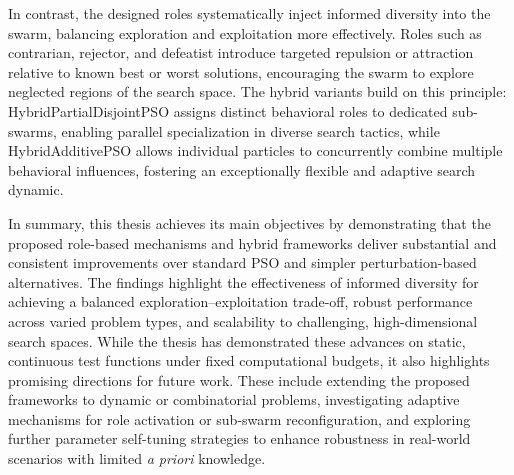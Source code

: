 In contrast, the designed roles systematically inject informed diversity into the swarm, balancing exploration and exploitation more effectively. Roles such as contrarian, rejector, and defeatist introduce targeted repulsion or attraction relative to known best or worst solutions, encouraging the swarm to explore neglected regions of the search space. The hybrid variants build on this principle: HybridPartialDisjointPSO assigns distinct behavioral roles to dedicated sub-swarms, enabling parallel specialization in diverse search tactics, while HybridAdditivePSO allows individual particles to concurrently combine multiple behavioral influences, fostering an exceptionally flexible and adaptive search dynamic.

In summary, this thesis achieves its main objectives by demonstrating that the proposed role-based mechanisms and hybrid frameworks deliver substantial and consistent improvements over standard PSO and simpler perturbation-based alternatives. The findings highlight the effectiveness of informed diversity for achieving a balanced exploration–exploitation trade-off, robust performance across varied problem types, and scalability to challenging, high-dimensional search spaces. While the thesis has demonstrated these advances on static, continuous test functions under fixed computational budgets, it also highlights promising directions for future work. These include extending the proposed frameworks to dynamic or combinatorial problems, investigating adaptive mechanisms for role activation or sub-swarm reconfiguration, and exploring further parameter self-tuning strategies to enhance robustness in real-world scenarios with limited \textit{a priori} knowledge.







